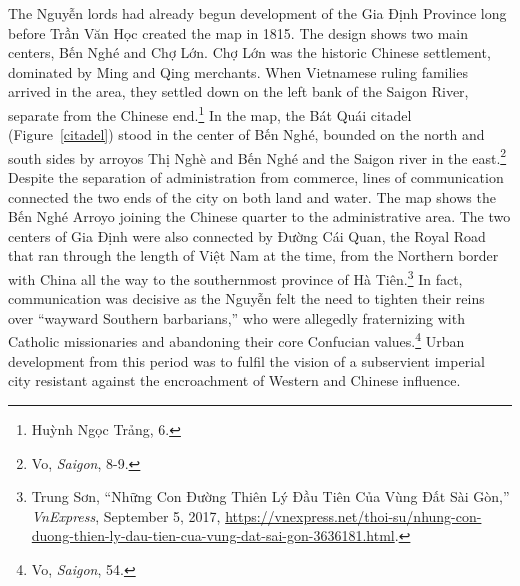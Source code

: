 \en

\begin{figure}[!ht]
\end{figure}

\vi
The Nguyễn lords had already begun development of the Gia Định Province long before Trần Văn Học created the map in 1815. The design shows two main centers, Bến Nghé and Chợ Lớn. Chợ Lớn was the historic Chinese settlement, dominated by Ming and Qing merchants. When Vietnamese ruling families arrived in the area, they settled down on the left bank of the Saigon River, separate from the Chinese end.\footnote{Huỳnh Ngọc Trảng, 6.} In the map, the Bát Quái citadel (Figure~\ref{citadel}) stood in the center of Bến Nghé, bounded on the north and south sides by arroyos Thị Nghè and Bến Nghé and the Saigon river in the east.\footnote{Vo, \textit{Saigon}, 8-9.} Despite the separation of administration from commerce, lines of communication connected the two ends of the city on both land and water. The map shows the Bến Nghé Arroyo joining the Chinese quarter to the administrative area. The two centers of Gia Định were also connected by Đường Cái Quan, the Royal Road that ran through the length of Việt Nam at the time, from the Northern border with China all the way to the southernmost province of Hà Tiên.\footnote{Trung Sơn, “Những Con Đường Thiên Lý Đầu Tiên Của Vùng Đất Sài Gòn,” \textit{VnExpress}, September 5, 2017, \url{https://vnexpress.net/thoi-su/nhung-con-duong-thien-ly-dau-tien-cua-vung-dat-sai-gon-3636181.html}.} In fact, communication was decisive as the Nguyễn felt the need to tighten their reins over “wayward Southern barbarians,” who were allegedly fraternizing with Catholic missionaries and abandoning their core Confucian values.\footnote{Vo, \textit{Saigon}, 54.} Urban development from this period was to fulfil the vision of a subservient imperial city resistant against the encroachment of Western and Chinese influence.

